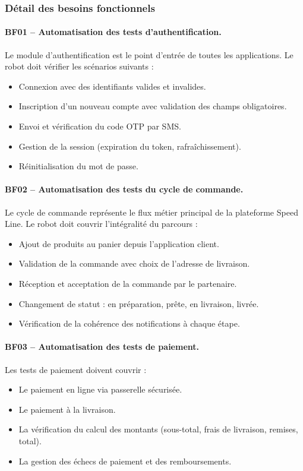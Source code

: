 \subsubsection{Détail des besoins fonctionnels}

\paragraph{BF01 -- Automatisation des tests d'authentification.}
Le module d'authentification est le point d'entrée de toutes les applications. Le robot doit vérifier les scénarios suivants :
\begin{itemize}[nosep]
    \item Connexion avec des identifiants valides et invalides.
    \item Inscription d'un nouveau compte avec validation des champs obligatoires.
    \item Envoi et vérification du code OTP par SMS.
    \item Gestion de la session (expiration du token, rafraîchissement).
    \item Réinitialisation du mot de passe.
\end{itemize}

\paragraph{BF02 -- Automatisation des tests du cycle de commande.}
Le cycle de commande représente le flux métier principal de la plateforme Speed Line. Le robot doit couvrir l'intégralité du parcours :
\begin{itemize}[nosep]
    \item Ajout de produits au panier depuis l'application client.
    \item Validation de la commande avec choix de l'adresse de livraison.
    \item Réception et acceptation de la commande par le partenaire.
    \item Changement de statut : en préparation, prête, en livraison, livrée.
    \item Vérification de la cohérence des notifications à chaque étape.
\end{itemize}

\paragraph{BF03 -- Automatisation des tests de paiement.}
Les tests de paiement doivent couvrir :
\begin{itemize}[nosep]
    \item Le paiement en ligne via passerelle sécurisée.
    \item Le paiement à la livraison.
    \item La vérification du calcul des montants (sous-total, frais de livraison, remises, total).
    \item La gestion des échecs de paiement et des remboursements.
\end{itemize}

